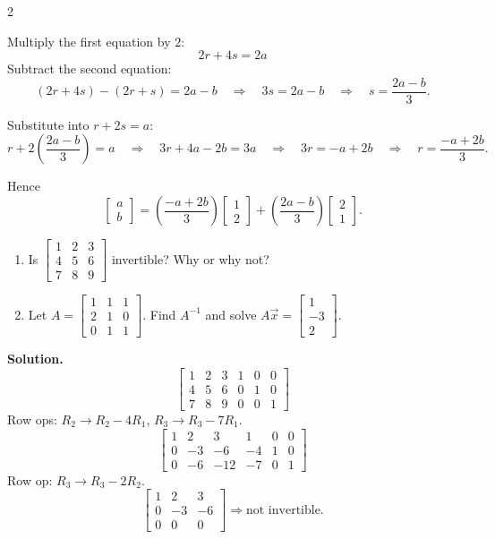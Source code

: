 \documentclass[8pt]{extarticle}
\begin{document}
\begin{multicols}{2}
\begin{tcolorbox}[title=]
Multiply the first equation by \(2\):
\[
2r+4s=2a
\]
Subtract the second equation:
\[
(2r+4s)-(2r+s)=2a-b
\quad\Rightarrow\quad
3s=2a-b
\quad\Rightarrow\quad
s=\dfrac{2a-b}{3}.
\]

Substitute into \(r+2s=a\):
\[
r+2\!\left(\dfrac{2a-b}{3}\right)=a
\quad\Rightarrow\quad
3r+4a-2b=3a
\quad\Rightarrow\quad
3r=-a+2b
\quad\Rightarrow\quad
r=\dfrac{-a+2b}{3}.
\]

Hence
\[
\begin{bmatrix}a\\b\end{bmatrix}
=
\left(\dfrac{-a+2b}{3}\right)
\begin{bmatrix}1\\2\end{bmatrix}
+
\left(\dfrac{2a-b}{3}\right)
\begin{bmatrix}2\\1\end{bmatrix}.
\]
\end{tcolorbox}

\begin{tcolorbox}[title=]
\noindent
\begin{enumerate}
\item[(a)] Is
\(
\begin{bmatrix}
1&2&3\\
4&5&6\\
7&8&9
\end{bmatrix}
\)
invertible? Why or why not?
\item[(b)] Let
\(A=\begin{bmatrix}1&1&1\\2&1&0\\0&1&1\end{bmatrix}\).
Find \(A^{-1}\) and solve
\(A\vec{x}=\begin{bmatrix}1\\-3\\2\end{bmatrix}\).
\end{enumerate}

\textbf{Solution.}
\[
\left[
\begin{array}{ccc|ccc}
1&2&3&1&0&0\\
4&5&6&0&1&0\\
7&8&9&0&0&1
\end{array}
\right]
\]
Row ops: \(R_2\to R_2-4R_1\), \(R_3\to R_3-7R_1\).
\[
\left[
\begin{array}{ccc|ccc}
1&2&3&1&0&0\\
0&-3&-6&-4&1&0\\
0&-6&-12&-7&0&1
\end{array}
\right]
\]
Row op: \(R_3\to R_3-2R_2\).
\[
\left[
\begin{array}{ccc}
1&2&3\\
0&-3&-6\\
0&0&0
\end{array}
\right]
\Rightarrow \text{not invertible.}
\]


\end{tcolorbox}
\end{multicols}
\end{document}
